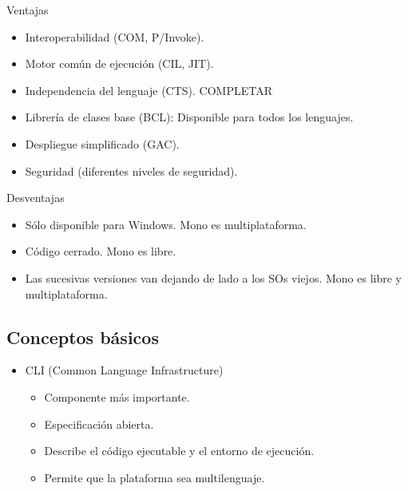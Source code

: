 \documentclass{beamer}
\begin{document}
\begin{frame}{Ventajas}
  \begin{itemize}
    \item Interoperabilidad (COM, P/Invoke).
    \item Motor común de ejecución (CIL, JIT).
    \item Independencia del lenguaje (CTS). COMPLETAR
    \item Librería de clases base (BCL): Disponible para todos los lenguajes.
    \item Despliegue simplificado (GAC).
    \item Seguridad (diferentes niveles de seguridad).
  \end{itemize}
\end{frame}


\begin{frame}{Desventajas}
  \begin{itemize}
    \item \alert{Sólo disponible para Windows.} Mono es multiplataforma.
    \item \alert{Código cerrado.} Mono es libre.
    \item \alert{Las sucesivas versiones van dejando de lado a los SOs viejos.}
      Mono es libre y multiplataforma.
  \end{itemize}
\end{frame}


\subsection{Conceptos básicos}

\begin{frame}%

  \begin{itemize}
    \item CLI (Common Language Infrastructure)
      \begin{itemize}
        \item Componente más importante.
        \item Especificación abierta.
        \item Describe el código ejecutable y el entorno de ejecución.
        \item Permite que la plataforma sea multilenguaje.
      \end{itemize}
  \end{itemize}
\end{frame}
\end{document}
